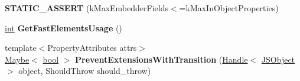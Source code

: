 \begin{DoxyCompactItemize}
{\bfseries S\+T\+A\+T\+I\+C\+\_\+\+A\+S\+S\+E\+RT} (k\+Max\+Embedder\+Fields$<$=k\+Max\+In\+Object\+Properties)
\item 
\mbox{\label{classv8_1_1internal_1_1JSObject_a781239b2920e67a657f230cc760a1132}} 
\mbox{\hyperlink{classint}{int}} {\bfseries Get\+Fast\+Elements\+Usage} ()
\item 
\mbox{\label{classv8_1_1internal_1_1JSObject_a0b6eb22e303860dc8b4ad5b08b3a1c12}} 
{\footnotesize template$<$Property\+Attributes attrs$>$ }\\\mbox{\hyperlink{classv8_1_1Maybe}{Maybe}}$<$ \mbox{\hyperlink{classbool}{bool}} $>$ {\bfseries Prevent\+Extensions\+With\+Transition} (\mbox{\hyperlink{classv8_1_1internal_1_1Handle}{Handle}}$<$ \mbox{\hyperlink{classv8_1_1internal_1_1JSObject}{J\+S\+Object}} $>$ object, Should\+Throw should\+\_\+throw)
\end{DoxyCompactItemize}

